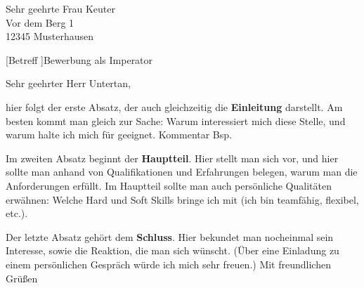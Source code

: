 \emergencystretch=20pt%

\begin{letter}{%
Sehr geehrte Frau Keuter\\
Vor dem Berg 1\\
12345 Musterhausen%
}

[Betreff ]{Bewerbung als Imperator}
\opening{Sehr geehrter Herr Untertan,}

hier folgt der erste Absatz, der auch gleichzeitig die \textbf{Einleitung} darstellt. Am besten kommt man gleich zur Sache: Warum interessiert mich diese Stelle, und warum halte ich mich für geeignet.  Kommentar \glqq Bsp\grqq .

Im zweiten Absatz beginnt der \textbf{Hauptteil}. Hier stellt man sich vor, und hier sollte man anhand von Qualifikationen und Erfahrungen belegen, warum man die Anforderungen erfüllt. Im Hauptteil sollte man auch persönliche Qualitäten erwähnen: Welche Hard und Soft Skills bringe ich mit (ich bin teamfähig, flexibel, etc.).

Der letzte Absatz gehört dem \textbf{Schluss}. Hier bekundet man nocheinmal sein Interesse, sowie die Reaktion, die man sich wünscht. (Über eine Einladung zu einem persönlichen Gespräch würde ich mich sehr freuen.)
\newline\newline\newline 
Mit freundlichen Grüßen\\\sig%
\encl{}
\end{letter}
